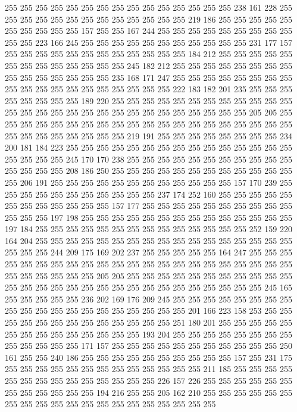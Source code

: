 255 255 255 255 255 255 255 255 255 255 255 255 255 255 255 238 161 228 255 255
255 255 255 255 255 255 255 255 255 255 255 219 186 255 255 255 255 255 255 255
255 255 255 157 255 255 167 244 255 255 255 255 255 255 255 255 255 255 255 223
166 245 255 255 255 255 255 255 255 255 255 255 255 231 177 157 255 255 255 255
255 255 255 255 255 255 255 255 184 212 255 255 255 255 255 255 255 255 255 255
255 255 255 245 182 212 255 255 255 255 255 255 255 255 255 255 255 255 255 255
255 235 168 171 247 255 255 255 255 255 255 255 255 255 255 255 255 255 255 255
255 255 255 255 222 183 182 201 235 255 255 255 255 255 255 255 255 189 220 255
255 255 255 255 255 255 255 255 255 255 255 255 255 255 255 255 255 255 255 255
255 255 255 255 255 255 255 205 205 255 255 255 255 255 255 255 255 255 255 255
255 255 255 255 255 255 255 255 255 255 255 255 255 255 255 255 255 219 191 255
255 255 255 255 255 255 255 234 200 181 184 223 255 255 255 255 255 255 255 255
255 255 255 255 255 255 255 255 255 255 255 245 170 170 238 255 255 255 255 255
255 255 255 255 255 255 255 255 255 255 208 186 250 255 255 255 255 255 255 255
255 255 255 255 255 255 206 191 255 255 255 255 255 255 255 255 255 255 255 255
157 170 239 255 255 255 255 255 255 255 255 255 255 255 237 174 252 160 255 255
255 255 255 255 255 255 255 255 255 255 157 177 255 255 255 255 255 255 255 255
255 255 255 255 255 197 198 255 255 255 255 255 255 255 255 255 255 255 255 255
255 197 184 255 255 255 255 255 255 255 255 255 255 255 255 255 255 252 159 220
164 204 255 255 255 255 255 255 255 255 255 255 255 255 255 255 255 255 255 255
255 255 244 209 175 169 202 237 255 255 255 255 255 164 247 255 255 255 255 255
255 255 255 255 255 255 255 255 255 255 255 255 255 255 255 255 255 255 255 255
255 255 255 205 205 255 255 255 255 255 255 255 255 255 255 255 255 255 255 255
255 255 255 255 255 255 255 255 255 255 255 255 255 245 165 255 255 255 255 255
236 202 169 176 209 245 255 255 255 255 255 255 255 255 255 255 255 255 255 255
255 255 255 255 255 255 201 166 223 158 253 255 255 255 255 255 255 255 255 255
255 255 255 255 251 180 201 255 255 255 255 255 255 255 255 255 255 255 255 255
255 193 204 255 255 255 255 255 255 255 255 255 255 255 255 255 171 157 255 255
255 255 255 255 255 255 255 255 255 250 161 255 255 240 186 255 255 255 255 255
255 255 255 255 255 157 255 231 175 255 255 255 255 255 255 255 255 255 255 255
255 255 211 185 255 255 255 255 255 255 255 255 255 255 255 255 255 255 226 157
226 255 255 255 255 255 255 255 255 255 255 255 255 194 216 255 255 205 162 210
255 255 255 255 255 255 255 255 255 255 255 255 255 255 255 255 255 255 255 255
